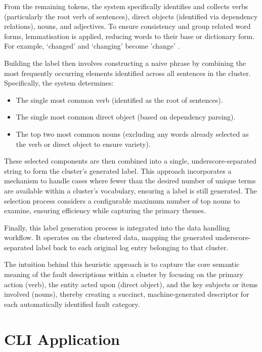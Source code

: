 \documentclass[10pt,oneside]{report}
\begin{document}
From the remaining tokens, the system specifically identifies and collects verbs (particularly the root verb of sentences), direct objects (identified via dependency relations), nouns, and adjectives. To ensure consistency and group related word forms, lemmatisation is applied, reducing words to their base or dictionary form. For example, `changed' and `changing' become 'change' \cite{tabassum2020survey}.

Building the label then involves constructing a naive phrase by combining the most frequently occurring elements identified across all sentences in the cluster. Specifically, the system determines:
\begin{itemize}
    \item The single most common verb (identified as the root of sentences).
    \item The single most common direct object (based on dependency parsing).
    \item The top two most common nouns (excluding any words already selected as the verb or direct object to ensure variety).
\end{itemize}

These selected components are then combined into a single, underscore-separated string to form the cluster's generated label. This approach incorporates a mechanism to handle cases where fewer than the desired number of unique terms are available within a cluster's vocabulary, ensuring a label is still generated. The selection process considers a configurable maximum number of top nouns to examine, ensuring efficiency while capturing the primary themes.

Finally, this label generation process is integrated into the data handling workflow. It operates on the clustered data, mapping the generated underscore-separated label back to each original log entry belonging to that cluster.

The intuition behind this heuristic approach is to capture the core semantic meaning of the fault descriptions within a cluster by focusing on the primary action (verb), the entity acted upon (direct object), and the key subjects or items involved (nouns), thereby creating a succinct, machine-generated descriptor for each automatically identified fault category.

\section{CLI Application}\label{sec:CLI}
\end{document}
